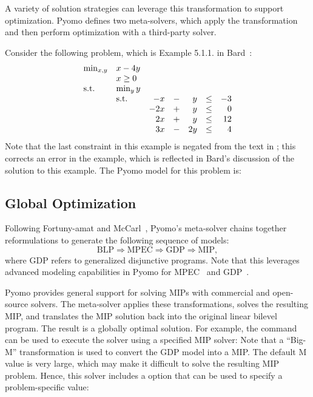 A variety of solution strategies can leverage this transformation
to support optimization.  Pyomo defines two meta-solvers, which
apply the  transformation and then perform
optimization with a third-party solver.

Consider the following problem, which is Example 5.1.1. in Bard~\citep{Bard98}:
\begin{equation}
\begin{array}{llrrrrrr}
\min_{x, y}     & x - 4 y & &&&&\\
                & x \geq 0 & &&&&\\
\textrm{s.t.}             & \min_{y} y & &&&&\\
                & \textrm{s.t.}   & - x &- &y &\leq &-3\\
                &       & -2 x &+ &y &\leq &0\\
                &       & 2 x &+ &y &\leq &12\\
                &       & 3 x &- &2 y &\leq &4
\end{array}
\end{equation}
Note that the last constraint in this example is negated from the text in \citet{Bard98};  this corrects an error in the example, which is reflected in Bard's discussion of the solution to this example.  The Pyomo model for this problem is:


\subsection{Global Optimization}

Following Fortuny-amat and McCarl~\cite{ForMcC81}, Pyomo's
 meta-solver chains together reformulations
to generate the following sequence of models:
\[
\textrm{BLP} \Rightarrow \textrm{MPEC} \Rightarrow \textrm{GDP} \Rightarrow \textrm{MIP},
\]
where GDP refers to generalized disjunctive programs.  Note that
this leverages advanced modeling capabilities in Pyomo for
MPEC~\cite{PyomoMPEC} and GDP~\cite{PyomoGDP}.

Pyomo provides general support for solving MIPs with commercial and
open-source solvers.  The  meta-solver
applies these transformations, solves the resulting MIP, and
translates the MIP solution back into the original linear bilevel
program.  The result is a globally optimal solution.  For example,
the  command can be used to execute the
 solver using a specified MIP solver:
Note that a ``Big-M'' transformation is used to convert the GDP
model into a MIP.  The default M value is very large, which may
make it difficult to solve the resulting MIP problem.  Hence, this solver includes
a  option that can be used to specify a problem-specific value:

